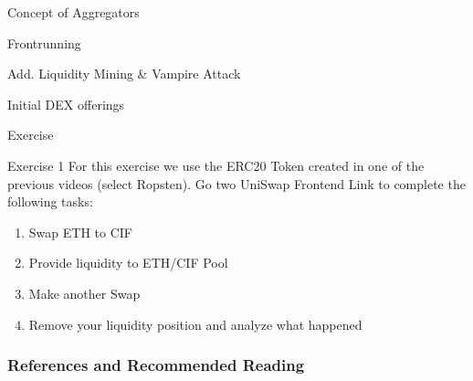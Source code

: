\documentclass[]{beamer}
\begin{document}
\begin{frame}{Concept of Aggregators}

\end{frame}


\begin{frame}{Frontrunning}

\end{frame}


\begin{frame}{Add. Liquidity Mining \& Vampire Attack}

\end{frame}


\begin{frame}{Initial DEX offerings}

\end{frame}


\begin{frame}{Exercise}
	\begin{exercise}{Exercise 1}
	For this exercise we use the ERC20 Token created in one of the previous videos (select Ropsten). Go two UniSwap Frontend Link to complete the following tasks:
	
		\begin{enumerate}
			\item Swap ETH to CIF
			\item Provide liquidity to ETH/CIF Pool
			\item Make another Swap
			\item Remove your liquidity position and analyze what happened
		\end{enumerate}
	\end{exercise}
\end{frame}



\begin{frame}%
\frametitle{References and Recommended Reading}
	
	
\end{frame}
\end{document}

